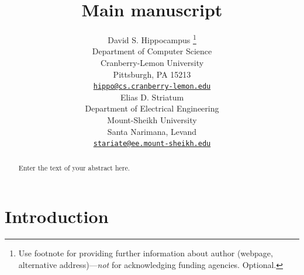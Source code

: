 \documentclass{article}
\title{Main manuscript}
\author{
    David S. Hippocampus
    \thanks{Use footnote for providing further information about author
(webpage, alternative address)---\emph{not} for acknowledging funding
agencies. Optional.}
   \\
    Department of Computer Science \\
    Cranberry-Lemon University \\
  Pittsburgh, PA 15213 \\
  \texttt{\href{mailto:hippo@cs.cranberry-lemon.edu}{\nolinkurl{hippo@cs.cranberry-lemon.edu}}} \\
   \And
    Elias D. Striatum
   \\
    Department of Electrical Engineering \\
    Mount-Sheikh University \\
  Santa Narimana, Levand \\
  \texttt{\href{mailto:stariate@ee.mount-sheikh.edu}{\nolinkurl{stariate@ee.mount-sheikh.edu}}} \\
  }
\begin{document}
\maketitle

\def\tightlist{}


\begin{abstract}
Enter the text of your abstract here.
\end{abstract}


\hypertarget{introduction}{%
\section{Introduction}\label{introduction}}
\end{document}
